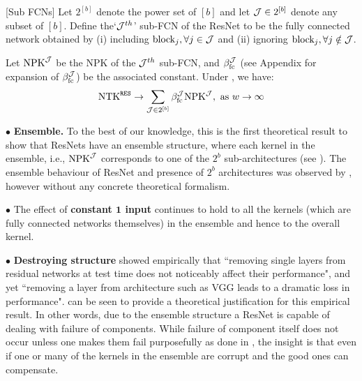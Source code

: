 \begin{definition}\label{def:subfcdnn}[Sub FCNs]
Let $2^{[b]}$ denote the power set of $[b]$ and let $\mathcal{J}\in 2^{[b]}$ denote any subset of $[b]$. Define the`$\mathcal{J}^{th}$' sub-FCN of the ResNet to be the fully connected network obtained by (i) including  $\text{block}_{j},\forall j\in \mathcal{J}$  and (ii) ignoring $\text{block}_{j},\forall j\notin \mathcal{J}$. %
\end{definition}
\begin{theorem}\label{th:res} 
Let $\text{NPK}^{\mathcal{J}}$ be the NPK of the $\mathcal{J}^{th}$ sub-FCN, and $\beta_{\text{fc}}^{\mathcal{J}}$ (see Appendix for expansion of $\beta_{\text{fc}}^{\mathcal{J}}$) be the associated constant. Under , we have:
\begin{align*}
\text{NTK}^{\texttt{RES}}\rightarrow \sum_{\mathcal{J}\in 2^{[b]}}  \beta_{\text{fc}}^{\mathcal{J}} \text{NPK}^{\mathcal{J}}, \,\, \text{as}\,\,  w\rightarrow\infty
\end{align*}
\end{theorem}
$\bullet$ \textbf{Ensemble.} To the best of our knowledge, this is the first theoretical result to show that ResNets have an ensemble structure, where  each kernel in the ensemble, i.e., $\text{NPK}^{\mathcal{J}}$ corresponds to one of the $2^b$ sub-architectures (see ). The ensemble behaviour of ResNet and  presence of $2^b$ architectures was observed by \cite{veit2016residual}, however without any concrete theoretical formalism. 

$\bullet$ The effect of \textbf{constant $\mathbf{1}$ input} continues to hold to all the kernels (which are fully connected networks themselves) in the ensemble and hence to the overall kernel.

$\bullet$ \textbf{Destroying structure} \cite{veit2016residual} showed empirically that ``removing single layers from residual networks at test time does not noticeably affect their performance", and yet ``removing a layer from architecture such as VGG leads to a dramatic loss in performance".  can be seen to provide a theoretical justification for this empirical result. In other words, due to the ensemble structure a ResNet is capable of dealing with failure of components. While failure of component itself does not occur unless one makes them fail purposefully as done in \citep{veit2016residual},  the insight is that even if one or many of the kernels in the ensemble are corrupt and the good ones can compensate.%

